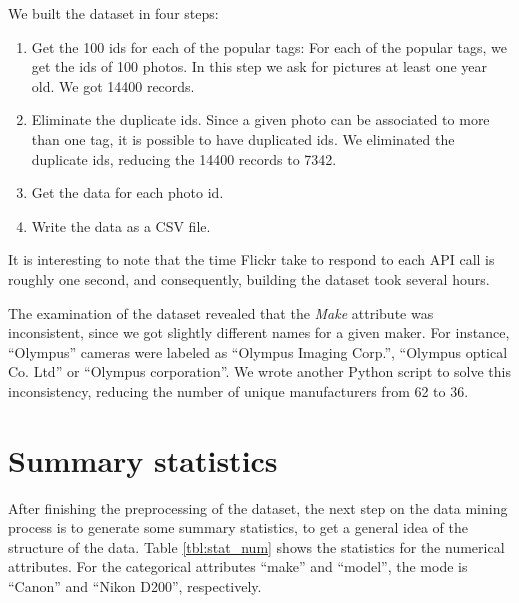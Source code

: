 \documentclass[letter,12pt]{article}
\begin{document}
We built the dataset in four steps:

\begin{enumerate}
\item Get the 100 ids for each of the popular tags: For each of the popular tags, we get the ids of 100 photos. In this step we ask for pictures at least one year old. We got 14400 records.
\item Eliminate the duplicate ids. Since a given photo can be associated to more than one tag, it is possible to have duplicated ids. We eliminated the duplicate ids, reducing the 14400 records to 7342.
\item Get the data for each photo id.
\item Write the data as a CSV file.
\end{enumerate}

It is interesting to note that the time Flickr take to respond to each API call is roughly one second, and consequently, building the dataset took several hours.

The examination of the dataset revealed that the \emph{Make} attribute was inconsistent, since we got slightly different names for a given maker. For instance, ``Olympus'' cameras were labeled as ``Olympus Imaging Corp.'', ``Olympus optical Co. Ltd'' or ``Olympus corporation''. We wrote another Python script to solve this inconsistency, reducing the number of unique manufacturers from 62 to 36.

\section{Summary statistics}

After finishing the preprocessing of the dataset, the next step on the data mining process is to generate some summary statistics, to get a general idea of the structure of the data. Table \ref{tbl:stat_num} shows the statistics for the numerical attributes. For the categorical attributes ``make'' and ``model'', the mode is ``Canon'' and ``Nikon D200'', respectively.
\end{document}
